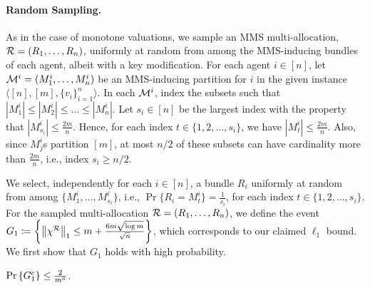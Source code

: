 \paragraph{Random Sampling.} As in the case of monotone valuations, we sample an MMS multi-allocation, $\mathcal{R}=(R_1, \ldots, R_n)$, uniformly at random from among the MMS-inducing bundles of each agent, albeit with a key modification. For each agent $i\in [n]$, let $\mathcal{M}^i=(M^i_1,\dots,M^i_n)$ be an MMS-inducing partition for $i$ in the given instance $\langle [n], [m], \{v_i\}_{i=1}^n \rangle$. In each $\mathcal{M}^i$, index the subsets such that $|M^i_1| \leq |M^i_2| \leq \dots \leq |M^i_n|$. Let $s_i \in [n]$ be the largest index with the property that $|M^i_{s_i}| \leq \frac{2m}{n}$. Hence, for each index $t \in \{1, 2, \ldots, s_i\}$, we have $|M^i_t| \leq \frac{2m}{n}$. Also, since $M^i_j$s partition $[m]$, at most $n/2$ of these subsets can have cardinality more than $\frac{2m}{n}$, i.e., index $s_i \geq n/2$.  

We select, independently for each $i \in [n]$, a bundle $R_i$ uniformly at random from among $\{M^i_1,\dots,M^i_{s_i} \}$, i.e., $\Pr \{ R_i = M^i_t \} = \frac{1}{s_i}$, for each index $t \in \{1, 2, \ldots, s_i\}$. For the sampled multi-allocation $\mathcal{R}=(R_1, \ldots, R_n)$, we define the event $G_1 \coloneqq \left\{\left\|\chi^{\mathcal{R}}\right\|_1 \leq m + \frac{6m  \sqrt{\log m} }{\sqrt{n}}\right\}$, which corresponds to our claimed $\ell_1$ bound. We first show that $G_1$ holds with high probability.


\begin{lemma}
\label{lem:l1_additive}
    $\Pr \left\{G_1^c\right\} \leq \frac{2}{m^3}$.
\end{lemma}

